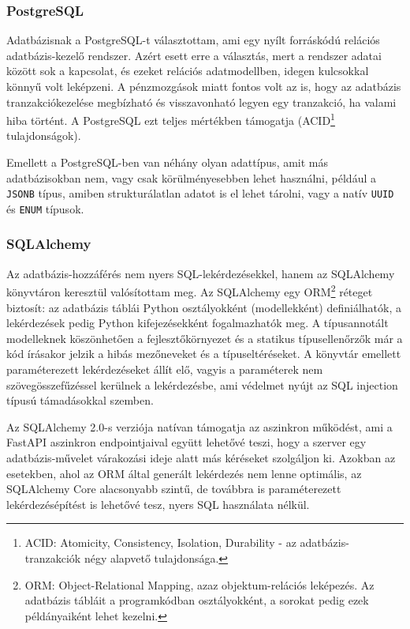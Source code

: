 \subsubsection{PostgreSQL}

Adatbázisnak a PostgreSQL-t \cite{PostgreSQL} választottam, ami egy nyílt forráskódú relációs adatbázis-kezelő rendszer. Azért esett erre a választás, mert a rendszer adatai között sok a kapcsolat, és ezeket relációs adatmodellben, idegen kulcsokkal könnyű volt leképzeni. A pénzmozgások miatt fontos volt az is, hogy az adatbázis tranzakciókezelése megbízható és visszavonható legyen egy tranzakció, ha valami hiba történt. A PostgreSQL ezt teljes mértékben támogatja (ACID\footnote{ACID: Atomicity, Consistency, Isolation, Durability - az adatbázis-tranzakciók négy alapvető tulajdonsága.} tulajdonságok).

Emellett a PostgreSQL-ben van néhány olyan adattípus, amit más adatbázisokban nem, vagy csak körülményesebben lehet használni, például a \texttt{JSONB} típus, amiben strukturálatlan adatot is el lehet tárolni, vagy a natív \texttt{UUID} és \texttt{ENUM} típusok.

\subsubsection{SQLAlchemy}

Az adatbázis-hozzáférés nem nyers SQL-lekérdezésekkel, hanem az SQLAlchemy \cite{SQLAlchemy} könyvtáron keresztül valósítottam meg. Az SQLAlchemy egy ORM\footnote{ORM: Object-Relational Mapping, azaz objektum-relációs leképezés. Az adatbázis tábláit a programkódban osztályokként, a sorokat pedig ezek példányaiként lehet kezelni.} réteget biztosít: az adatbázis táblái Python osztályokként (modellekként) definiálhatók, a lekérdezések pedig Python kifejezésekként fogalmazhatók meg. A típusannotált modelleknek köszönhetően a fejlesztőkörnyezet és a statikus típusellenőrzők már a kód írásakor jelzik a hibás mezőneveket és a típuseltéréseket. A könyvtár emellett paraméterezett lekérdezéseket állít elő, vagyis a paraméterek nem szövegösszefűzéssel kerülnek a lekérdezésbe, ami védelmet nyújt az SQL injection típusú támadásokkal szemben.

Az SQLAlchemy 2.0-s verziója natívan támogatja az aszinkron működést, ami a FastAPI aszinkron endpointjaival együtt lehetővé teszi, hogy a szerver egy adatbázis-művelet várakozási ideje alatt más kéréseket szolgáljon ki. Azokban az esetekben, ahol az ORM által generált lekérdezés nem lenne optimális, az SQLAlchemy Core alacsonyabb szintű, de továbbra is paraméterezett lekérdezésépítést is  lehetővé tesz, nyers SQL használata nélkül.

